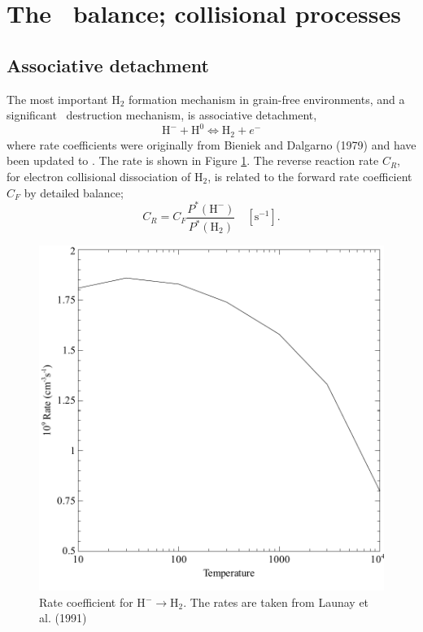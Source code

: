 \section{The \hminus\ balance; collisional processes}

\subsection{Associative detachment}

The most important H$_2$ formation mechanism in grain-free environments,
and a significant \hminus\ destruction mechanism, is associative detachment,
\begin{equation}
{{\mathrm{H}}^ - } + {{\mathrm{H}}^0} \Leftrightarrow {{\mathrm{H}}_2} + {e^ - }
\end{equation}
where rate coefficients were originally from Bieniek and Dalgarno (1979)
and have been updated to \citet{Launay1991}.  The rate is shown in Figure
\ref{fig:hminus_to_h2}.  The reverse reaction rate $C_R$, for electron collisional dissociation
of H$_2$, is related to the forward rate coefficient $C_F$ by detailed balance;
\begin{equation}
{C_R} = {C_F}\frac{{{P^*}({{\mathrm{H}}^ - })}}{{{P^*}({{\mathrm{H}}_2})}}
\quad  [\mathrm{s}^{-1}].
\end{equation}

\begin{figure}
\centering
\includegraphics[scale=0.8]{hminus_to_h2}
\caption{Rate coefficient for H$^- \to \mathrm{H}_2$.
The rates are taken from Launay et al. (1991)}
\label{fig:hminus_to_h2}
\end{figure}

